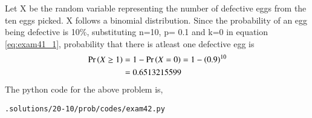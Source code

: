 Let X be the random variable representing the number of defective eggs from the ten eggs picked. X follows a  binomial distribution.  Since the probability of an egg being defective is 10\%, substituting n=10, p= 0.1 and k=0 in equation \eqref{eq:exam41_1}, 
probability that there is atleast one defective egg is 
\begin{align}
\Pr\left(X \geq 1\right)&= 1 - \Pr\left(X=0\right)  = 1-\left(0.9\right)^{10}
\\
&=0.6513215599
\end{align}
The python code for the above problem is,
\begin{lstlisting}
.solutions/20-10/prob/codes/exam42.py
\end{lstlisting}
